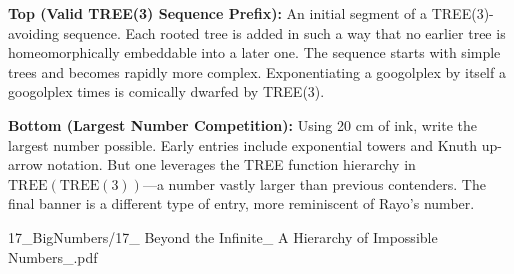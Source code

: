 \begin{SideNotePage}{
  \textbf{Top (Valid TREE(3) Sequence Prefix):}  
  An initial segment of a TREE(3)-avoiding sequence. Each rooted tree is added in such a way that no earlier tree is homeomorphically embeddable into a later one. The sequence starts with simple trees and becomes rapidly more complex. Exponentiating a googolplex by itself a googolplex times is comically dwarfed by TREE(3). \par

  \textbf{Bottom (Largest Number Competition):}  
  Using 20 cm of ink, write the largest number possible. Early entries include exponential towers and Knuth up-arrow notation. But one leverages the TREE function hierarchy in $\text{TREE}(\text{TREE}(3))$—a number vastly larger than previous contenders. The final banner is a different type of entry, more reminiscent of Rayo's number. \par
}{17_BigNumbers/17_ Beyond the Infinite_ A Hierarchy of Impossible Numbers_.pdf}
\end{SideNotePage}


